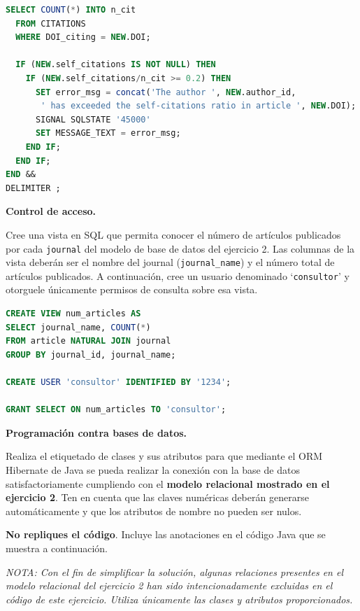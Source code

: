 \documentclass[12pt,a4paper,addpoints,answers]{exam}
\begin{document}
\begin{questions}
\begin{parts}
\begin{solution}[30em]
\begin{lstlisting}[language=SQL]
  SELECT COUNT(*) INTO n_cit
  FROM CITATIONS
  WHERE DOI_citing = NEW.DOI;
  
  IF (NEW.self_citations IS NOT NULL) THEN
    IF (NEW.self_citations/n_cit >= 0.2) THEN
      SET error_msg = concat('The author ', NEW.author_id, 
       ' has exceeded the self-citations ratio in article ', NEW.DOI);
      SIGNAL SQLSTATE '45000'
      SET MESSAGE_TEXT = error_msg;
    END IF;
  END IF;
END &&
DELIMITER ;
\end{lstlisting}
\end{solution}
\end{parts}

\newpage
\question[1] \textbf{Control de acceso.}

Cree una vista en SQL que permita conocer el número de artículos publicados por cada \texttt{journal} del modelo de base de datos del ejercicio 2. Las columnas de la vista deberán ser el nombre del journal (\texttt{journal\_name}) y el número total de artículos publicados. A continuación, cree un usuario denominado `\texttt{consultor}' y otorguele únicamente permisos de consulta sobre esa vista.
        
\begin{solution}[16em]
\begin{lstlisting}[language=SQL]
CREATE VIEW num_articles AS 
SELECT journal_name, COUNT(*)
FROM article NATURAL JOIN journal
GROUP BY journal_id, journal_name;

CREATE USER 'consultor' IDENTIFIED BY '1234';

GRANT SELECT ON num_articles TO 'consultor';
\end{lstlisting}
\end{solution}

\newpage
\question[1] \textbf{Programación contra bases de datos.}

Realiza el etiquetado de clases y sus atributos para que mediante el ORM Hibernate de Java se pueda realizar la conexión con la base de datos satisfactoriamente cumpliendo con el \textbf{modelo relacional mostrado en el ejercicio 2}. Ten en cuenta que las claves numéricas deberán generarse automáticamente y que los atributos de nombre no pueden ser nulos.

\textbf{No repliques el código}. Incluye las anotaciones en el código Java que se muestra a continuación.

\textit{NOTA: Con el fin de simplificar la solución, algunas relaciones presentes en el modelo relacional del ejercicio 2 han sido intencionadamente excluidas en el código de este ejercicio. Utiliza únicamente las clases y atributos proporcionados.}


\end{questions}
\end{document}
